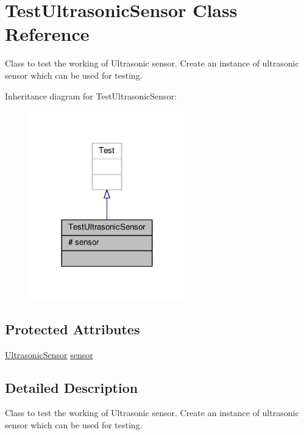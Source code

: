 \hypertarget{class_test_ultrasonic_sensor}{}\section{Test\+Ultrasonic\+Sensor Class Reference}
\label{class_test_ultrasonic_sensor}


Class to test the working of Ultrasonic sensor. Create an instance of ultrasonic sensor which can be used for testing.  




Inheritance diagram for Test\+Ultrasonic\+Sensor\+:\nopagebreak
\begin{figure}[H]
\begin{center}
\leavevmode
\includegraphics[width=191pt]{class_test_ultrasonic_sensor__inherit__graph}
\end{center}
\end{figure}
\subsection*{Protected Attributes}
\begin{DoxyCompactItemize}
\item 
\hyperlink{class_ultrasonic_sensor}{Ultrasonic\+Sensor} \hyperlink{class_test_ultrasonic_sensor_abaaead54c0ad8a32f353b38b2f84127a}{sensor}
\end{DoxyCompactItemize}


\subsection{Detailed Description}
Class to test the working of Ultrasonic sensor. Create an instance of ultrasonic sensor which can be used for testing. 

